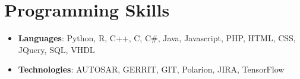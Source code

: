 \documentclass[letterpaper,11pt]{article}
\newcommand{\CvSubHeadingListStart}{\begin{itemize}[leftmargin=*,topsep = 0pt]}
\newcommand{\CvSubHeadingListEnd}{\end{itemize}}
\begin{document}
\section{Programming Skills}
 \CvSubHeadingListStart
   \item{
     \textbf{Languages}{: Python, R, C++, C, C\#, Java, Javascript, PHP, HTML, CSS, JQuery, SQL, VHDL}}
   \item{
    \textbf{Technologies}{: AUTOSAR, GERRIT, GIT, Polarion, JIRA, TensorFlow}
   }  
 \CvSubHeadingListEnd


\end{document}
